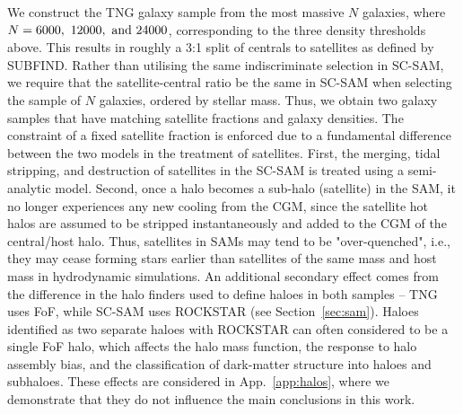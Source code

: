 \documentclass[fleqn,usenatbib]{mnras}
\begin{document}
We construct the TNG galaxy sample from the most massive $N$ galaxies, where $N = 6000, \ 12000, \ {\rm and} \ 24000$, corresponding to the three density thresholds above. This results in roughly a 3:1 split of centrals to satellites as defined by SUBFIND. Rather than utilising the same indiscriminate selection in SC-SAM, we require that the satellite-central ratio be the same in SC-SAM when selecting the sample of $N$ galaxies, ordered by stellar mass. Thus, we obtain two galaxy samples that have matching satellite fractions and galaxy densities. The constraint of a fixed satellite fraction is enforced due to a fundamental difference between the two models in the treatment of satellites. First, the merging, tidal stripping, and destruction of satellites in the SC-SAM is treated using a semi-analytic model. Second, once a halo becomes a sub-halo (satellite) in the SAM, it no longer experiences any new cooling from the CGM, since the satellite hot halos are assumed to be stripped instantaneously and added to the CGM of the central/host halo. Thus, satellites in SAMs may tend to be "over-quenched", i.e., they may cease forming stars earlier than satellites of the same mass and host mass in hydrodynamic simulations. 
An additional secondary effect comes from the difference in the halo finders used to define haloes in both samples -- TNG uses FoF, while SC-SAM uses \textsc{ROCKSTAR} (see Section~\ref{sec:sam}). Haloes identified as two separate haloes with \textsc{ROCKSTAR} can often considered to be a single FoF halo, which affects the halo mass function, the response to halo assembly bias, and the classification of dark-matter structure into haloes and subhaloes. These effects are considered in App.~\ref{app:halos}, where we demonstrate that they do not influence the main conclusions in this work.
\end{document}
